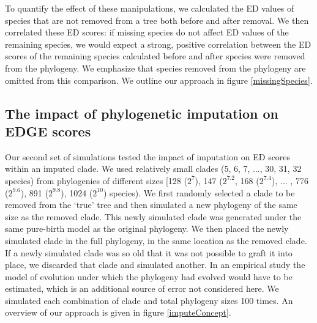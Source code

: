 \documentclass[10pt,english]{article}
\begin{document}
To quantify the effect of these manipulations, we calculated the ED values of
species that are not removed from a tree both before and after removal. We then
correlated these ED scores: if missing species do not affect ED values of the
remaining species, we would expect a strong, positive correlation between the ED
scores of the remaining species calculated before and after species were removed
from the phylogeny. We emphasize that species removed from the phylogeny are
omitted from this comparison. We outline our approach in figure
\ref{missingSpecies}.

\subsection*{The impact of phylogenetic imputation on EDGE scores}
Our second set of simulations tested the impact of imputation on ED scores
within an imputed clade. We used relatively small clades (5, 6, 7, ..., 30, 31,
32 species) from phylogenies of different sizes [128 ($2^7$), 147 ($2^{7.2}$,
168 ($2^{7.4}$), ... , 776 ($2^{9.6}$), 891 ($2^{9.8}$), 1024 ($2^{10}$)
species). We first randomly selected a clade to be removed from the ‘true' tree
and then simulated a new phylogeny of the same size as the removed clade. This
newly simulated clade was generated under the same pure-birth model as the
original phylogeny. We then placed the newly simulated clade in the full
phylogeny, in the same location as the removed clade. If a newly simulated clade
was so old that it was not possible to graft it into place, we discarded that
clade and simulated another. In an empirical study the model of evolution under
which the phylogeny had evolved would have to be estimated, which is an
additional source of error not considered here. We simulated each combination of
clade and total phylogeny sizes 100 times. An overview of our approach is given
in figure \ref{imputeConcept}. 
\end{document}
